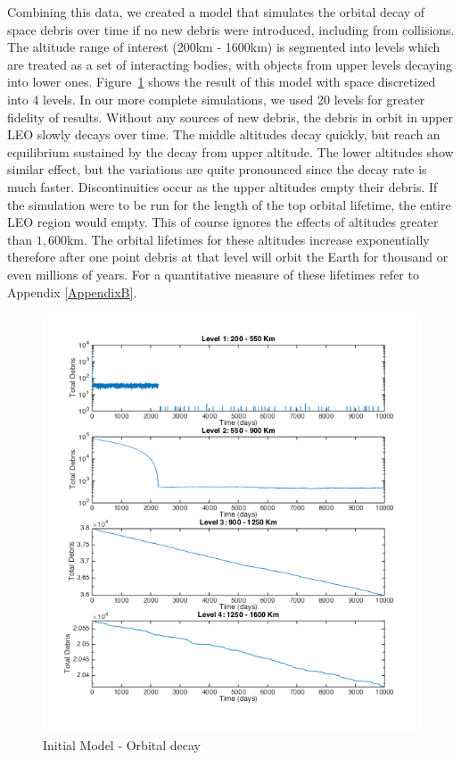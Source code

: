 \documentclass[pre,12pt]{revtex4-1}
\begin{document}
Combining this data, we created a model that simulates the orbital decay of space debris over time if no new debris were introduced, including from collisions. The altitude range of interest (200km - 1600km) is segmented into levels which are treated as a set of interacting bodies, with objects from upper levels decaying into lower ones. Figure~\ref{fig:init_model} shows the result of this model with space discretized into 4 levels. In our more complete simulations, we used 20 levels for greater fidelity of results. Without any sources of new debris, the debris in orbit in upper LEO slowly decays over time. The middle altitudes decay quickly, but reach an equilibrium sustained by the decay from upper altitude. The lower altitudes show similar effect, but the variations are quite pronounced since the decay rate is much faster. Discontinuities occur as the upper altitudes empty their debris. If the simulation were to be run for the length of the top orbital lifetime, the entire LEO region would empty. This of course ignores the effects of altitudes greater than $1,600$km. The orbital lifetimes for these altitudes increase exponentially therefore after one point debris at that level will orbit the Earth for thousand or even millions of years. For a quantitative measure of these lifetimes refer to Appendix \ref{AppendixB}.

\begin{figure}[h!]
	\includegraphics[width=.75\textwidth]{"Figures/Model1_4_10000"}
	\caption{Initial Model - Orbital decay}
	\label{fig:init_model}
\end{figure}
\end{document}
